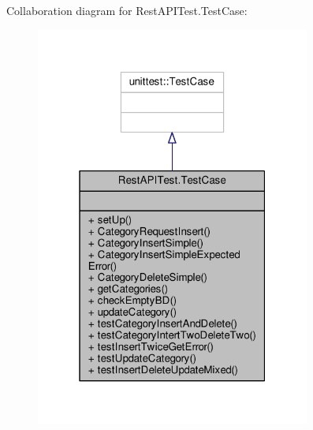 Collaboration diagram for Rest\+A\+P\+I\+Test.\+Test\+Case\+:\nopagebreak
\begin{figure}[H]
\begin{center}
\leavevmode
\includegraphics[width=256pt]{de/d87/classRestAPITest_1_1TestCase__coll__graph}
\end{center}
\end{figure}
